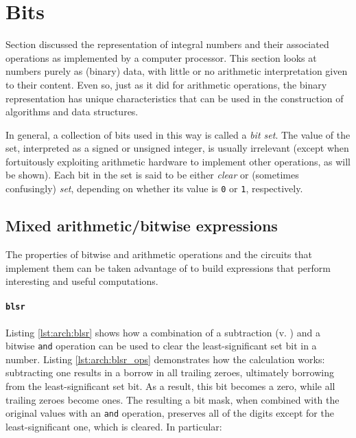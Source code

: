 \section{Bits}

Section  discussed the representation of integral numbers
and their associated operations as implemented by a computer processor.  This
section looks at numbers purely as (binary) data, with little or no arithmetic
interpretation given to their content.  Even so, just as it did for arithmetic
operations, the binary representation has unique characteristics that can be
used in the construction of algorithms and data structures.

In general, a collection of bits used in this way is called a \textit{bit set}.
The value of the set, interpreted as a signed or unsigned integer, is usually
irrelevant (except when fortuitously exploiting arithmetic hardware to implement
other operations, as will be shown).  Each bit in the set is said to be either
\textit{clear} or (sometimes confusingly) \textit{set}, depending on whether its
value is \texttt{0} or \texttt{1}, respectively.

\subsection{Mixed arithmetic/bitwise expressions}

\label{subsubsec:arch:mixed}

The properties of bitwise and arithmetic operations and the circuits that
implement them can be taken advantage of to build expressions that perform
interesting and useful computations.

\paragraph{\texttt{blsr}}

Listing \ref{lst:arch:blsr} shows how a combination of a subtraction (v.
) and a bitwise \texttt{and} operation can be used
to clear the least-significant set bit in a number.  Listing
\ref{lst:arch:blsr_ops} demonstrates how the calculation works: subtracting one
results in a borrow in all trailing zeroes, ultimately borrowing from the
least-significant set bit.  As a result, this bit becomes a zero, while all
trailing zeroes become ones.  The resulting a bit mask, when combined with the
original values with an \texttt{and} operation, preserves all of the digits
except for the least-significant one, which is cleared.  In particular:

